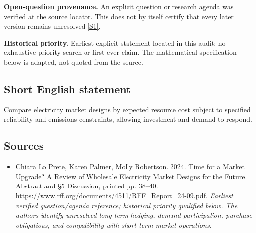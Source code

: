 \documentclass[11pt]{article}
\newcommand{\sref}[2]{\hyperlink{source:#1:#2}{[S#2]}}
\begin{document}
\par\textbf{Open-question provenance.} An explicit question or research agenda was verified at the source locator. This does not by itself certify that every later version remains unresolved \sref{30007719}{1}.

\par\textbf{Historical priority.} Earliest explicit statement located in this audit; no exhaustive priority search or first-ever claim. The mathematical specification below is adapted, not quoted from the source.

\subsection{Short English statement}
Compare electricity market designs by expected resource cost subject to specified reliability and emissions constraints, allowing investment and demand to respond.

\subsection{Sources}
\begin{itemize}\raggedright
\item[\textnormal{[S1]}]\hypertarget{source:30007719:1}{} Chiara Lo Prete, Karen Palmer, Molly Robertson. 2024. Time for a Market Upgrade? A Review of Wholesale Electricity Market Designs for the Future. Abstract and §5 Discussion, printed pp. 38–40.
\url{https://www.rff.org/documents/4511/RFF_Report_24-09.pdf}.
{\small\textit{Earliest verified question/agenda reference; historical priority qualified below. The authors identify unresolved long-term hedging, demand participation, purchase obligations, and compatibility with short-term market operations.}}
\end{itemize}
\end{document}
